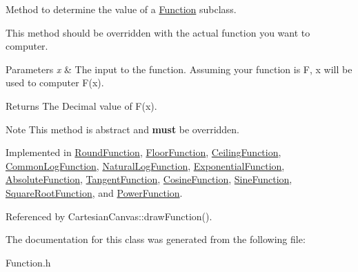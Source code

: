 Method to determine the value of a \hyperlink{class_function}{Function} subclass. 

This method should be overridden with the actual function you want to computer. 
\begin{DoxyParams}{Parameters}
{\em x} & The input to the function. Assuming your function is F, x will be used to computer F(x). \\
\hline
\end{DoxyParams}
\begin{DoxyReturn}{Returns}
The Decimal value of F(x). 
\end{DoxyReturn}
\begin{DoxyNote}{Note}
This method is abstract and {\bfseries must} be overridden. 
\end{DoxyNote}


Implemented in \hyperlink{class_round_function_aa1d0e06605d9317f4971ffb3b7219825}{Round\+Function}, \hyperlink{class_floor_function_a3d73d81c614e58fcf8d08cbf2d5c37ab}{Floor\+Function}, \hyperlink{class_ceiling_function_a5aac31296f54c9af13acfbe2dc8559d2}{Ceiling\+Function}, \hyperlink{class_common_log_function_a96f716f78cdab4c5458f8372424b52a4}{Common\+Log\+Function}, \hyperlink{class_natural_log_function_af9192cb43f0d62106525dafbdef0b414}{Natural\+Log\+Function}, \hyperlink{class_exponential_function_acb8ed2181be3fa4082a8ff3a61e711a1}{Exponential\+Function}, \hyperlink{class_absolute_function_a10fbd656965076a13b6a58ba908b242f}{Absolute\+Function}, \hyperlink{class_tangent_function_a1353a701417a2be51492d59276e5a5b7}{Tangent\+Function}, \hyperlink{class_cosine_function_a0a0a5067e129d5183b17d4f0bfffd435}{Cosine\+Function}, \hyperlink{class_sine_function_a551d6f4e81a2cdc03c185260a0738a10}{Sine\+Function}, \hyperlink{class_square_root_function_a6044091d737d7bd72325621c2dc56a7a}{Square\+Root\+Function}, and \hyperlink{class_power_function_ad0aa1887b0434963b69a4d51fc725bcc}{Power\+Function}.



Referenced by Cartesian\+Canvas\+::draw\+Function().



The documentation for this class was generated from the following file\+:\begin{DoxyCompactItemize}
\item 
Function.\+h\end{DoxyCompactItemize}
